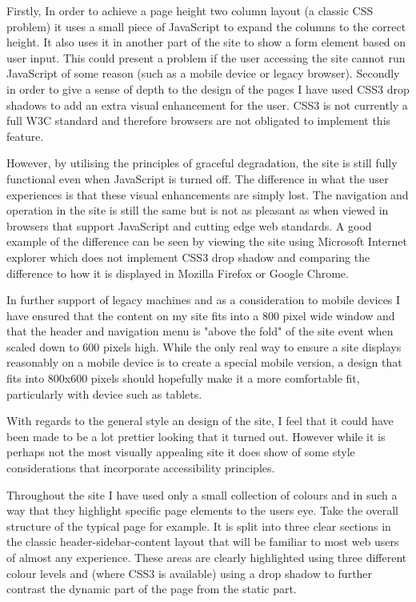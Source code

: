 \documentclass{article}
\begin{document}
Firstly, In order to achieve a page height two column layout (a classic CSS problem) it uses a small piece of JavaScript to expand the columns to the correct height. It also uses it in another part of the site to show a form element based on user input. This could present a problem if the user accessing the site cannot run JavaScript of some reason (such as a mobile device or legacy browser). Secondly in order to give a sense of depth to the design of the pages I have used CSS3 drop shadows to add an extra visual enhancement for the user. CSS3 is not currently a full W3C standard and therefore browsers are not obligated to implement this feature.

However, by utilising the principles of graceful degradation, the site is still fully functional even when JavaScript is turned off. The difference in what the user experiences is that these visual enhancements are simply lost. The navigation and operation in the site is still the same but is not as pleasant as when viewed in browsers that support JavaScript and cutting edge web standards. A good example of the difference can be seen by viewing the site using Microsoft Internet explorer which does not implement CSS3 drop shadow and comparing the difference to how it is displayed in Mozilla Firefox or Google Chrome. 

In further support of legacy machines and as a consideration to mobile devices I have ensured that the content on my site fits into a 800 pixel wide window and that the header and navigation menu is "above the fold" of the site event when scaled down to 600 pixels high. While the only real way to ensure a site displays reasonably on a mobile device is to create a special mobile version, a design that fits into 800x600 pixels should hopefully make it a more comfortable fit, particularly with device such as tablets.

With regards to the general style an design of the site, I feel that it could have been made to be a lot prettier looking that it turned out. However while it is perhaps not the most visually appealing site it does show of some style considerations that incorporate accessibility principles.

Throughout the site I have used only a small collection of colours and in such a way that they highlight specific page elements to the users eye. Take the overall structure of the typical page for example. It is split into three clear sections in the classic header-sidebar-content layout that will be familiar to most web users of almost any experience. These areas are clearly highlighted using three different colour levels and (where CSS3 is available) using a drop shadow to further contrast the dynamic part of the page from the static part.
\end{document}
